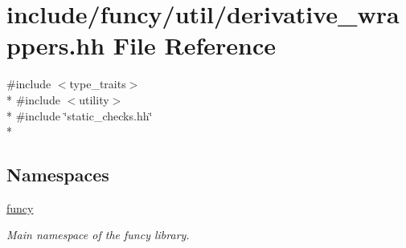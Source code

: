\hypertarget{derivative__wrappers_8hh}{\section{include/funcy/util/derivative\-\_\-wrappers.hh File Reference}
\label{derivative__wrappers_8hh}
}
{\ttfamily \#include $<$type\-\_\-traits$>$}\\*
{\ttfamily \#include $<$utility$>$}\\*
{\ttfamily \#include \char`\"{}static\-\_\-checks.\-hh\char`\"{}}\\*
\subsection*{Namespaces}
\begin{DoxyCompactItemize}
\item 
\hyperlink{namespacefuncy}{funcy}
\begin{DoxyCompactList}\small\item\em Main namespace of the funcy library. \end{DoxyCompactList}\end{DoxyCompactItemize}
